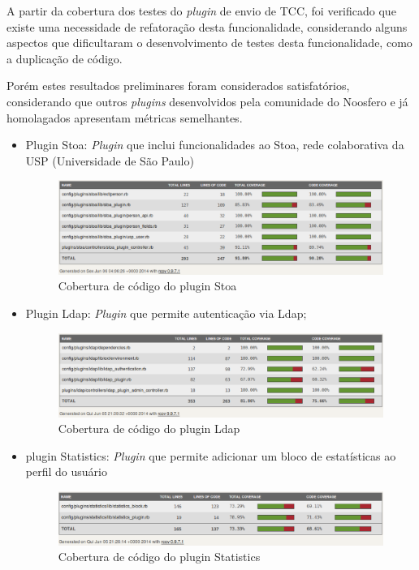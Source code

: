 A partir da cobertura dos testes do \textit{plugin} de envio de TCC, foi verificado que existe uma necessidade de refatoração desta funcionalidade, considerando alguns aspectos que dificultaram o desenvolvimento de testes desta funcionalidade, como a duplicação de código.

Porém estes resultados preliminares foram considerados satisfatórios, considerando que outros \textit{plugins} desenvolvidos pela comunidade do Noosfero e já homolagados apresentam métricas semelhantes.
\begin{itemize}
\item Plugin Stoa: \textit{Plugin} que inclui funcionalidades ao Stoa, rede colaborativa da USP (Universidade de São Paulo)

\begin{figure}[!h]
    \centering
    \includegraphics[keepaspectratio=false,scale=0.45]
      {figuras/stoa.eps}
    \caption{Cobertura de código do plugin Stoa}
    \label{consideracoes_cobertura3}
\end{figure}

\item Plugin Ldap: \textit{Plugin} que permite autenticação via Ldap;

\begin{figure}[!h]
    \centering
    \includegraphics[keepaspectratio=false,scale=0.45]
      {figuras/ldap.eps}
    \caption{Cobertura de código do plugin Ldap}
    \label{consideracoes_cobertura4}
\end{figure}

\item plugin Statistics: \textit{Plugin} que permite adicionar um bloco de estatísticas ao perfil do usuário

\begin{figure}[!h]
    \centering
    \includegraphics[keepaspectratio=false,scale=0.45]
      {figuras/statistics.eps}
    \caption{Cobertura de código do plugin Statistics}
    \label{consideracoes_cobertura3}
\end{figure}

\end{itemize}

